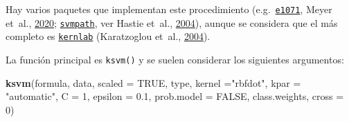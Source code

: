 \documentclass[
  spanish,
]{book}
\newenvironment{Shaded}{\begin{snugshade}}{\end{snugshade}}
\newcommand{\DataTypeTok}[1]{\textcolor[rgb]{0.13,0.29,0.53}{#1}}
\newcommand{\DecValTok}[1]{\textcolor[rgb]{0.00,0.00,0.81}{#1}}
\newcommand{\FloatTok}[1]{\textcolor[rgb]{0.00,0.00,0.81}{#1}}
\newcommand{\KeywordTok}[1]{\textcolor[rgb]{0.13,0.29,0.53}{\textbf{#1}}}
\newcommand{\NormalTok}[1]{#1}
\newcommand{\OtherTok}[1]{\textcolor[rgb]{0.56,0.35,0.01}{#1}}
\newcommand{\StringTok}[1]{\textcolor[rgb]{0.31,0.60,0.02}{#1}}
\theoremstyle{break}
\theoremstyle{definition}
\theoremstyle{definition}
\theoremstyle{definition}
\theoremstyle{remark}
\begin{document}
Hay varios paquetes que implementan este procedimiento (e.g.~\href{https://CRAN.R-project.org/package=e1071}{\texttt{e1071}}, Meyer et~al., \protect\hyperlink{ref-R-e1071}{2020}; \href{https://CRAN.R-project.org/package=svmpath}{\texttt{svmpath}}, ver Hastie et~al., \protect\hyperlink{ref-hastie2004entire}{2004}), aunque se considera que el más completo es \href{https://CRAN.R-project.org/package=kernlab}{\texttt{kernlab}} (Karatzoglou et~al., \protect\hyperlink{ref-kernlab2004}{2004}).

La función principal es \texttt{ksvm()} y se suelen considerar los siguientes argumentos:

\begin{Shaded}
\begin{Highlighting}[]
\KeywordTok{ksvm}\NormalTok{(formula, data, }\DataTypeTok{scaled =} \OtherTok{TRUE}\NormalTok{, type,}
  \DataTypeTok{kernel =}\StringTok{"rbfdot"}\NormalTok{, }\DataTypeTok{kpar =} \StringTok{"automatic"}\NormalTok{,}
  \DataTypeTok{C =} \DecValTok{1}\NormalTok{, }\DataTypeTok{epsilon =} \FloatTok{0.1}\NormalTok{, }\DataTypeTok{prob.model =} \OtherTok{FALSE}\NormalTok{, }
\NormalTok{  class.weights, }\DataTypeTok{cross =} \DecValTok{0}\NormalTok{)}
\end{Highlighting}
\end{Shaded}
\end{document}
